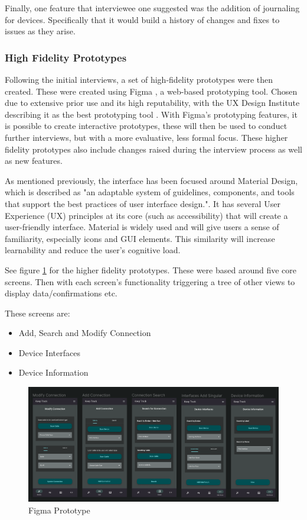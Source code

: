 \documentclass [11pt,a4paper]{article}
\begin{document}
Finally, one feature that interviewee one suggested was the addition of journaling for devices. Specifically that it would build a history of changes and fixes to issues as they arise. 


\subsubsection{High Fidelity Prototypes}
\label{sec:ui_design_high_fidelity_prototypes}

Following the initial interviews, a set of high-fidelity prototypes were then created. These were created using Figma \cite{figma}, a web-based prototyping tool. Chosen due to extensive prior use and its high reputability, with the UX Design Institute describing it as the best prototyping tool \cite{figmaUX}. With Figma's prototyping features, it is possible to create interactive prototypes, these will then be used to conduct further interviews, but with a more evaluative, less formal focus. These higher fidelity prototypes also include changes raised during the interview process as well as new features.

As mentioned previously, the interface has been focused around Material Design, which is described as "an adaptable system of guidelines, components, and tools that support the best practices of user interface design."\cite{materialDesign}. It has several User Experience (UX) principles at its core (such as accessibility) that will create a user-friendly interface. Material is widely used and will give users a sense of familiarity, especially icons and GUI elements. This similarity will increase learnability and reduce the user's cognitive load.

See figure \ref{fig:figma} for the higher fidelity prototypes. These were based around five core screens. Then with each screen's functionality triggering a tree of other views to display data/confirmations etc. 

These screens are:
\begin{itemize}
    \item Add, Search and Modify Connection
    \item Device Interfaces
    \item Device Information
\end{itemize}

\begin{figure}[H]
    \centering
    \includegraphics[width=1\textwidth]{images/figma_prototype.png}
    \caption{Figma Prototype}
    \label{fig:figma}
\end{figure}
\end{document}
